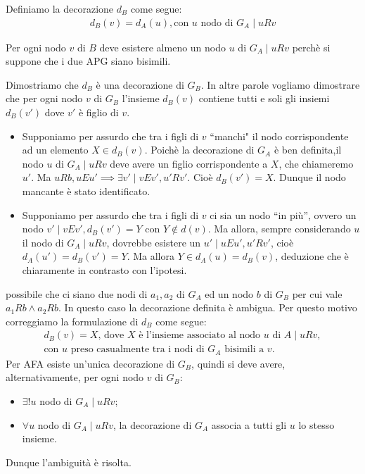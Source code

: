 \begin{proof2}
\begin{enumerate}
              Definiamo la decorazione $d_B$ come segue:
              \begin{gather*}
                  d_B(v) = d_A(u), \text{con $u$ nodo di $G_A$} \mid u R v
              \end{gather*}
              \begin{observation*}
                  Per ogni nodo $v$ di $B$ deve esistere almeno un nodo $u$ di $G_A \mid u R v$ perchè si suppone che i due APG siano bisimili.
              \end{observation*}
              Dimostriamo che $d_B$ è una decorazione di $G_B$. In altre parole vogliamo dimostrare che per ogni nodo $v$ di $G_B$ l'insieme $d_B(v)$ contiene tutti e soli gli insiemi $d_B(v')$ dove $v'$ è figlio di $v$.
              \begin{itemize}
                  \item Supponiamo per assurdo che tra i figli di $v$ ``manchi" il nodo corrispondente ad un elemento $X \in d_B(v)$. Poichè la decorazione di $G_A$ è ben definita,il nodo $u$ di $G_A \mid u R v$ deve avere un figlio corrispondente a $X$, che chiameremo $u'$. Ma $u R b, u E u' \implies \exists v' \mid v E v', u' R v'$. Cioè $d_B(v') = X$. Dunque il nodo mancante è stato identificato.
                  \item Supponiamo per assurdo che tra i figli di $v$ ci sia un nodo ``in più'', ovvero un nodo $v' \mid v E v', d_B(v') = Y$ con $Y \notin d(v)$. Ma allora, sempre considerando $u$ il nodo di $G_A \mid u R v$, dovrebbe esistere un $u' \mid u E u', u' R v'$, cioè $d_A(u') = d_B(v') = Y$.
                  Ma allora $Y \in d_A(u) = d_B(v)$, deduzione che è chiaramente in contrasto con l'ipotesi.
              \end{itemize}
              \accente possibile che ci siano due nodi di $a_1, a_2$ di $G_A$ ed un nodo $b$ di $G_B$ per cui vale $a_1 R b \land a_2 R b$. In questo caso la decorazione definita è ambigua. Per questo motivo correggiamo la formulazione di $d_B$ come segue:
              \begin{gather*}
                d_B(v) = X \text{, dove $X$ è l'insieme associato al nodo $u$ di $A$} \mid u R v, \\
                \text{con $u$ preso casualmente tra i nodi di $G_A$ bisimili a $v$.}
              \end{gather*}
              Per AFA esiste un'unica decorazione di $G_B$, quindi si deve avere, alternativamente, per ogni nodo $v$ di $G_B$:
              \begin{itemize}
                  \item $\exists ! u$ nodo di $G_A \mid u R v$;
                  \item $\forall u$ nodo di $G_A \mid u R v$, la decorazione di $G_A$ associa a tutti gli $u$ lo stesso insieme.
              \end{itemize}
              Dunque l'ambiguità è risolta.
    \end{enumerate}
    \vspace*{-0.75cm}
\end{proof2}

